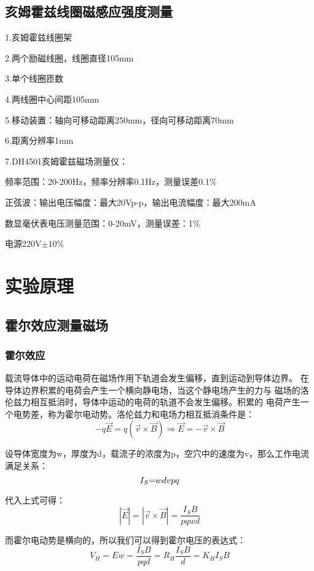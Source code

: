 \documentclass[12pt,a4paper]{article}
\newcommand*{\song}{\CJKfamily{zhsong}}
\newcommand{\sectionfont}{\song\textbf}
\begin{document}
    \subsection{亥姆霍兹线圈磁感应强度测量}
        1.亥姆霍兹线圈架\par
        2.两个励磁线圈，线圈直径105mm\par
        3.单个线圈匝数\par
        4.两线圈中心间距105mm\par
        5.移动装置：轴向可移动距离250mm，径向可移动距离70mm\par
        6.距离分辨率1mm\par
        7.DH4501亥姆霍兹磁场测量仪：\par
        频率范围：20-200Hz，频率分辨率0.1Hz，测量误差0.1$\%$\par
        正弦波：输出电压幅度：最大20Vp-p，输出电流幅度：最大200mA\par
        数显毫伏表电压测量范围：0-20mV，测量误差：1$\%$\par
        电源220V$\pm$10$\%$

\section{\sectionfont 实验原理}
    \subsection{霍尔效应测量磁场}
        \subsubsection{霍尔效应}
        载流导体中的运动电荷在磁场作用下轨道会发生偏移，直到运动到导体边界。
        在导体边界积累的电荷会产生一个横向静电场，当这个静电场产生的力与
        磁场的洛伦兹力相互抵消时，导体中运动的电荷的轨道不会发生偏移。积累的
        电荷产生一个电势差，称为霍尔电动势。洛伦兹力和电场力相互抵消条件是：
        \[ - q\vec E = q(\vec v \times \vec B) \Rightarrow \vec E =  - \vec v \times \vec B\]

        设导体宽度为w，厚度为d，载流子的浓度为p，空穴中的速度为v，那么工作电流满足关系：
        \[{I_S}{\rm{ = }}wdvpq\]

        代入上式可得：
        \[\left| {\vec E} \right| = \left| {\vec v \times \vec B} \right| = \frac{{{I_S}B}}{{pqwd}}\]
        
        而霍尔电动势是横向的，所以我们可以得到霍尔电压的表达式：
        \[{V_H} = Ew = \frac{{{I_S}B}}{{pqd}} = {R_H}\frac{{{I_S}B}}{d} = {K_H}{I_S}B\]
        
\end{document}
